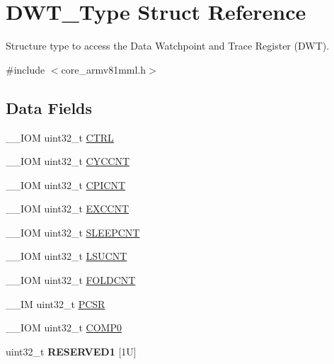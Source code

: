 \hypertarget{struct_d_w_t___type}{}\section{D\+W\+T\+\_\+\+Type Struct Reference}
\label{struct_d_w_t___type}


Structure type to access the Data Watchpoint and Trace Register (D\+WT).  




{\ttfamily \#include $<$core\+\_\+armv81mml.\+h$>$}

\subsection*{Data Fields}
\begin{DoxyCompactItemize}
\item 
\+\_\+\+\_\+\+I\+OM uint32\+\_\+t \mbox{\hyperlink{struct_d_w_t___type_ac81efc171e9852a36caeb47122bfec5b}{C\+T\+RL}}
\item 
\+\_\+\+\_\+\+I\+OM uint32\+\_\+t \mbox{\hyperlink{struct_d_w_t___type_a14822f5ad3426799332ac537d9293f3c}{C\+Y\+C\+C\+NT}}
\item 
\+\_\+\+\_\+\+I\+OM uint32\+\_\+t \mbox{\hyperlink{struct_d_w_t___type_a29ca657c77928334be08a2e6555be950}{C\+P\+I\+C\+NT}}
\item 
\+\_\+\+\_\+\+I\+OM uint32\+\_\+t \mbox{\hyperlink{struct_d_w_t___type_afe0bbc124e53ad450abc72bfb56bd74f}{E\+X\+C\+C\+NT}}
\item 
\+\_\+\+\_\+\+I\+OM uint32\+\_\+t \mbox{\hyperlink{struct_d_w_t___type_aafa1400cd3168b21652b86599ad3ed83}{S\+L\+E\+E\+P\+C\+NT}}
\item 
\+\_\+\+\_\+\+I\+OM uint32\+\_\+t \mbox{\hyperlink{struct_d_w_t___type_ae886261750c8c90d67a2f276d074e9c3}{L\+S\+U\+C\+NT}}
\item 
\+\_\+\+\_\+\+I\+OM uint32\+\_\+t \mbox{\hyperlink{struct_d_w_t___type_a6324c1fbf6c94f1eaf742d09ad678216}{F\+O\+L\+D\+C\+NT}}
\item 
\+\_\+\+\_\+\+IM uint32\+\_\+t \mbox{\hyperlink{struct_d_w_t___type_a72e52fffe9ac6af0ee15877e2d5dac41}{P\+C\+SR}}
\item 
\+\_\+\+\_\+\+I\+OM uint32\+\_\+t \mbox{\hyperlink{struct_d_w_t___type_a5d0c69187f8abc99ecbde49431cf0050}{C\+O\+M\+P0}}
\item 
\mbox{\label{struct_d_w_t___type_aaa45b15c650670f4f84000a1f419ca00}} 
uint32\+\_\+t {\bfseries R\+E\+S\+E\+R\+V\+E\+D1} \mbox{[}1\+U\mbox{]}

\end{DoxyCompactItemize}
